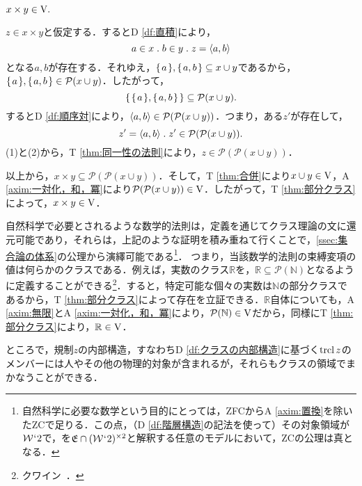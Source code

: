 \begin{thm}[直積]
\label{thm:直積}
$
    x\times y\in\mathrm{V}.
$
\end{thm}
\setcounter{equation}{0}
\begin{pf}
    $ z\in x\times y $と仮定する．するとD \ref{df:直積}により，
    \begin{equation}
        a\in x\con{1}b\in y\con{1}z = \orp{a,b}
    \end{equation}
    となる$a,b$が存在する．それゆえ，$ \{\mspace{2mu}a\mspace{2mu}\},\{\mspace{2mu}a,b\mspace{2mu}\}\subseteq x\cup y $であるから，$ \{\mspace{2mu}a\mspace{2mu}\},\{\mspace{2mu}a,b\mspace{2mu}\}\in\mathcal{P}(x\cup y)$．したがって，
    \[
        \{\mspace{2mu}\{\mspace{2mu}a\mspace{2mu}\},\{\mspace{2mu}a,b\mspace{2mu}\}\mspace{2mu}\}\subseteq\mathcal{P}(x\cup y).
    \]
    するとD \ref{df:順序対}により，$ \langle a,b \rangle\in\mathcal{P}(\mathcal{P}(x\cup y)) $．つまり，ある$ z' $が存在して，
    \begin{equation}
        z'=\orp{a,b}\con{1}z'\in \mathcal{P}(\mathcal{P}(x\cup y)).
    \end{equation}
    (1)と(2)から，T \ref{thm:同一性の法則}により，$ z\in\mathcal{P}(\mathcal{P}(x\cup y)) $．

    以上から，$ x\times y\subseteq \mathcal{P}(\mathcal{P}(x\cup y)) $．そして，T \ref{thm:合併}により$x\cup y\in\mathrm{V}$，A \ref{axim:一対化，和，冪}により$\mathcal{P}(\mathcal{P}(x\cup y))\in\mathrm{V}$．したがって，T \ref{thm:部分クラス}によって，$x\times y\in\mathrm{V}$．
\end{pf}

自然科学で必要とされるような数学的法則は，定義を通じてクラス理論の文に還元可能であり，それらは，上記のような証明を積み重ねて行くことで，\ref{ssec:集合論の体系}の公理から演繹可能である\footnote{
    自然科学に必要な数学という目的にとっては，ZFCからA \ref{axim:置換}を除いたZCで足りる．この点，（D \ref{df:階層構造}の記法を使って）その対象領域が$\mathcal{W}{\mspace{1mu}{`}\mspace{1mu}} 2$で，\kagi{$ \in $}を$ \mathfrak{E}\cap(\mathcal{W}{\mspace{1mu}{`}\mspace{1mu}} 2)^{\times 2} $と解釈する任意のモデルにおいて，ZCの公理は真となる．
}．
つまり，当該数学的法則の束縛変項の値は何らかのクラスである．例えば，実数のクラス$\mathbb{R}$を，$ \mathbb{R}\subseteq\mathcal{P}(\mathbb{N}) $となるように定義することができる\footnote{
    クワイン~\cite[pp.\,113--117]{クワインa}．
}．すると，特定可能な個々の実数は$\mathbb{N}$の部分クラスであるから，T \ref{thm:部分クラス}によって存在を立証できる．$\mathbb{R}$自体についても，A \ref{axim:無限}とA \ref{axim:一対化，和，冪}により，$ \mathcal{P}(\mathbb{N})\in\mathrm{V} $だから，同様にT \ref{thm:部分クラス}により，$ \mathbb{R}\in\mathrm{V} $．

ところで，規制$ z $の内部構造，すなわちD \ref{df:クラスの内部構造}に基づく$ \operatorname{trcl} z $のメンバーには人やその他の物理的対象が含まれるが，それらもクラスの領域でまかなうことができる．

